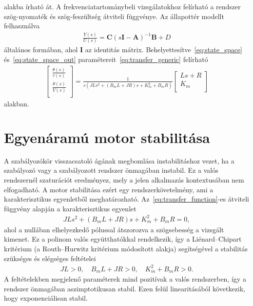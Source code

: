 alakba írható át. A frekvenciatartománybeli vizsgálatokhoz felírható a rendszer 
szög-nyomaték és szög-feszültség átviteli függvénye. Az állapottér modellt felhasználva
\begin{align}\label{eq:transfer_generic}
    \frac{Y(s)}{U(s)} = \bm C{\left(s \bm I - \bm A\right)}^{-1} \bm B + D
\end{align}
általános formában, ahol $\bm I$ az identitás mátrix. Behelyettesítve~\eqref{eq:state_space} és~\eqref{eq:state_space_out}
paramétereit~\eqref{eq:transfer_generic} felírható
\begin{align}\label{eq:transfer_function}
    \begin{bmatrix}
        \frac{\theta(s)}{\tau(s)} \\ 
        \frac{\theta(s)}{V(s)} \\ 
    \end{bmatrix}
    =
    \frac{1}{s\left(JLs^2 + \left(B_m L + JR\right)s + K_m^2 + B_m R\right)}
    \begin{bmatrix}
        Ls + R \\ 
        K_m \\ 
    \end{bmatrix}
\end{align}
alakban.

\section{Egyenáramú motor stabilitása}
A szabályozókör visszacsatoló ágának megbomlása instabilitáshoz vezet, ha a 
szabályozó vagy a szabályozott rendszer önmagában instabil. Ez a valós rendszernél 
szaturációt eredményez, mely a jelen alkalmazás kontextusában nem elfogadható. A motor stabilitása ezért 
egy rendszerkövetelmény, ami a karakterisztikus egyenletből meghatározható.
Az~\eqref{eq:transfer_function}-es átviteli függvény alapján a karakterisztikus egyenlet
\begin{align}
    JLs^2 + \left(B_m L + JR\right)s + K_m^2 + B_m R = 0,
\end{align}
ahol a nullában elhelyezkedő pólussal átszorozva a szögsebesség a vizsgált kimenet.
Ez a polinom valós együtthatókkal rendelkezik, így a Liénard--Chipart kritérium (a \mbox{Routh--Hurwitz} kritérium módosított
alakja) segítségével a stabilitás szükséges és elégséges feltételei
\begin{align}
    JL>0,\quad B_m L + JR > 0,\quad K_m^2 + B_m R > 0.
\end{align}
A feltételekben megjelenő paraméterek mind pozitívak a valós rendszerben, így a rendszer
önmagában aszimptotikusan stabil. Ezen felül linearitásából következik, hogy exponenciálisan stabil.

